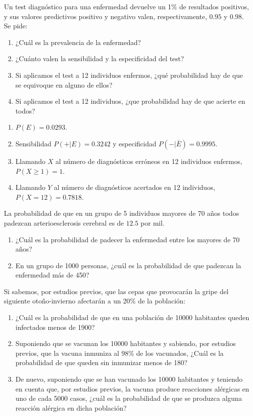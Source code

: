 {Un test diagnóstico para una enfermedad devuelve un 1\% de resultados positivos, y sus valores predictivos positivo y negativo valen, respectivamente, $0.95$ y $0.98$. Se pide:
\begin{enumerate}
\item ¿Cuál es la prevalencia de la enfermedad?
\item ¿Cuánto valen la sensibilidad y la especificidad del test?
\item Si aplicamos el test a 12 individuos enfermos, ¿qué probabilidad hay de que se equivoque en alguno de ellos?
\item Si aplicamos el test a 12 individuos, ¿que probabilidad hay de que acierte en todos?
\end{enumerate}
} 
{
\begin{enumerate}
\item $P(E)=0.0293$.
\item Sensibilidad $P(+|E)=0.3242$ y especificidad $P(-|\bar E)=0.9995$. 
\item Llamando $X$ al número de diagnósticos erróneos en 12 individuos enfermos, $P(X\geq 1)=1$. 
\item Llamando $Y$ al número de diagnósticos acertados en 12 individuos, $P(X=12)=0.7818$. 
\end{enumerate}
}
{
}


{La probabilidad de que en un grupo de 5 individuos mayores de 70 años todos padezcan arterioesclerosis cerebral es de $12.5$ por mil.
\begin{enumerate}
\item ¿Cuál es la probabilidad de padecer la enfermedad entre los mayores de 70 años?
\item En un grupo de 1000 personas, ¿cuál es la probabilidad de que padezcan la enfermedad más de 450?
\end{enumerate}
} 
{
}
{
}


{Si sabemos, por estudios previos, que las cepas que provocarán la gripe del siguiente otoño-invierno afectarán a un 20\% de la
población:
\begin{enumerate}
\item ¿Cuál es la probabilidad de que en una población de 10000 habitantes queden infectados menos de 1900?
\item Suponiendo que se vacunan los 10000 habitantes y sabiendo, por estudios previos, que la vacuna inmuniza al 98\% de los vacunados,
¿Cuál es la probabilidad de que queden sin inmunizar menos de 180?
\item De nuevo, suponiendo que se han vacunado los 10000 habitantes y teniendo en cuenta que, por estudios previos, la vacuna produce
reacciones alérgicas en uno de cada 5000 casos, ¿cuál es la probabilidad de que se produzca alguna reacción alérgica en dicha población?
\end{enumerate}
} 
{
}
{
}

